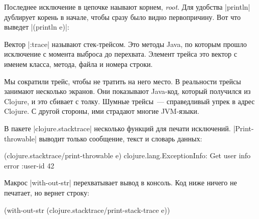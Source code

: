 Последнее исключение в цепочке наывают корнем, \emph{root}. Для удобства
\spverb|println| дублирует корень в начале, чтобы сразу было видно
первопричину. Вот что выведет \spverb|(println e)|:

\begin{english}
\end{english}

Вектор \spverb|:trace| называют стек-трейсом. Это методы Java, по которым прошло
исключение с момента выброса до перехвата. Элемент трейса это вектор с именем
класса, метода, файла и номера строки.

Мы сократили трейс, чтобы не тратить на него место. В реальности трейсы занимают
несколько экранов. Они показывают Java-код, который получился из Clojure, и это
сбивает с толку. Шумные трейсы~--- справедливый упрек в адрес Clojure. С другой
стороны, ими страдают многие JVM-языки.

В пакете \spverb|clojure.stacktrace| несколько функций для печати
исключений. \spverb|Print-throwable| выводит только сообщение, текст и
словарь данных:

\begin{english}
  \begin{clojure}
(clojure.stacktrace/print-throwable e)
clojure.lang.ExceptionInfo: Get user info error
{:user-id 42}
  \end{clojure}
\end{english}

Макрос \spverb|with-out-str| перехватывает вывод в консоль. Код ниже ничего не
печатает, но вернет строку:

\begin{english}
  \begin{clojure}
(with-out-str
  (clojure.stacktrace/print-stack-trace e))
  \end{clojure}
\end{english}

